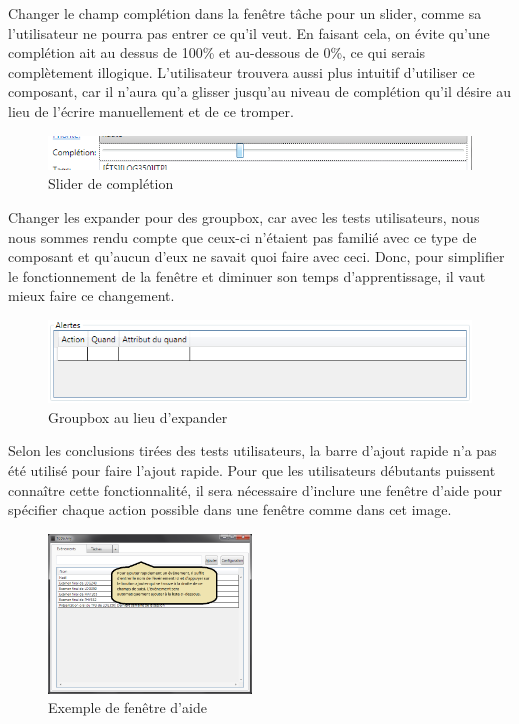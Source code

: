 \documentclass[letterpaper, oneside, 12pt, these, creativecommons]{thETS}
\begin{document}
\newpage

Changer le champ complétion dans la fenêtre tâche pour un slider, comme sa l'utilisateur ne pourra pas entrer ce qu'il veut. En faisant cela, on évite qu'une complétion ait au dessus de 100\% et au-dessous de 0\%, ce qui serais complètement illogique. L'utilisateur trouvera aussi plus intuitif d'utiliser ce composant, car il n'aura qu'a glisser jusqu'au niveau de complétion qu'il désire au lieu de l'écrire manuellement et de ce tromper.

\begin{figure}[H!]
	\centering
	\includegraphics[width=1\textwidth]{completion.png}
	\caption{Slider de complétion}
\end{figure}

Changer les expander pour des groupbox, car avec les tests utilisateurs, nous nous sommes rendu compte que ceux-ci n'étaient pas familié avec ce type de composant et qu'aucun d'eux ne savait quoi faire avec ceci. Donc, pour simplifier le fonctionnement de la fenêtre et diminuer son temps d'apprentissage, il vaut mieux faire ce changement.

\begin{figure}[H!]
	\centering
	\includegraphics[width=1\textwidth]{groupbox.png}
	\caption{Groupbox au lieu d'expander}
\end{figure}

Selon les conclusions tirées des tests utilisateurs, la barre d'ajout rapide n'a pas été utilisé pour faire l'ajout rapide. Pour que les utilisateurs débutants puissent connaître cette fonctionnalité, il sera nécessaire d'inclure une fenêtre d'aide pour spécifier chaque action possible dans une fenêtre comme dans cet image.

\begin{figure}[H!]
	\centering
	\includegraphics[width=0.48\textwidth]{help.png}
	\caption{Exemple de fenêtre d'aide}
\end{figure}
\end{document}
